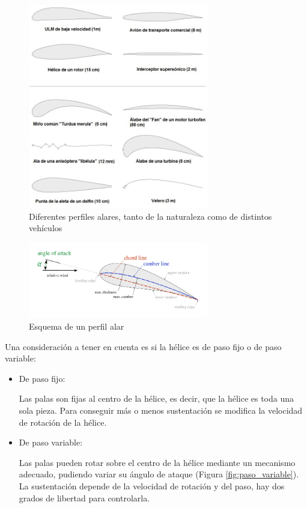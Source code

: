 \documentclass[12pt,twoside]{article}
\begin{document}
		\begin{figure}
			\centering
			\includegraphics[width=0.7\textwidth]{Imatges/Funcionament/Perfiles_alares.png}
			\caption{Diferentes perfiles alares, tanto de la naturaleza como de distintos vehículos}
			\label{fig:Perfiles_alares}
		\end{figure}

		\begin{figure}
			\centering
			\includegraphics[width=0.7\textwidth]{Imatges/Funcionament/airfoil.png}
			\caption{Esquema de un perfil alar}
			\label{fig:airfoil}
		\end{figure}
		
		Una consideración a tener en cuenta es si la hélice es de paso fijo o de paso variable:
		\begin{itemize}
			\item De paso fijo: 
			
			Las palas son fijas al centro de la hélice, es decir, que la hélice es toda una sola pieza. Para conseguir más o menos sustentación se modifica la velocidad de rotación de la hélice.
			\item De paso variable: 
			
			Las palas pueden rotar sobre el centro de la hélice mediante un mecanismo adecuado, pudiendo variar su ángulo de ataque (Figura \ref{fig:paso_variable}). La sustentación depende de la velocidad de rotación y del paso, hay dos grados de libertad para controlarla.
		\end{itemize}
\end{document}
